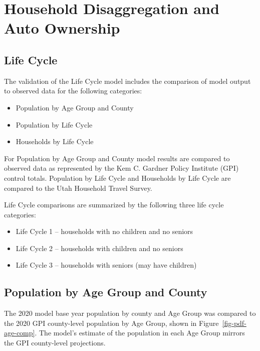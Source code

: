 \documentclass[
  letterpaper,
  DIV=11,
  numbers=noendperiod]{scrreprt}
\providecommand{\tightlist}{%
  \setlength{\itemsep}{0pt}\setlength{\parskip}{0pt}}\usepackage{longtable,booktabs,array}
\begin{document}

\hypertarget{household-disaggregation-and-auto-ownership}{%
\chapter{Household Disaggregation and Auto
Ownership}\label{household-disaggregation-and-auto-ownership}}

\hypertarget{life-cycle}{%
\section{Life Cycle}\label{life-cycle}}

The validation of the Life Cycle model includes the comparison of model
output to observed data for the following categories:

\begin{itemize}
\tightlist
\item
  Population by Age Group and County
\item
  Population by Life Cycle
\item
  Households by Life Cycle
\end{itemize}

For Population by Age Group and County model results are compared to
observed data as represented by the Kem C. Gardner Policy Institute
(GPI) control totals. Population by Life Cycle and Households by Life
Cycle are compared to the Utah Household Travel Survey.

Life Cycle comparisons are summarized by the following three life cycle
categories:

\begin{itemize}
\tightlist
\item
  Life Cycle 1 -- households with no children and no seniors
\item
  Life Cycle 2 -- households with children and no seniors
\item
  Life Cycle 3 -- households with seniors (may have children)
\end{itemize}

\hypertarget{population-by-age-group-and-county}{%
\section{Population by Age Group and
County}\label{population-by-age-group-and-county}}

The 2020 model base year population by county and Age Group was compared
to the 2020 GPI county-level population by Age Group, shown in
Figure~\ref{fig-pdf-age-comp}. The model's estimate of the population in
each Age Group mirrors the GPI county-level projections.
\end{document}
